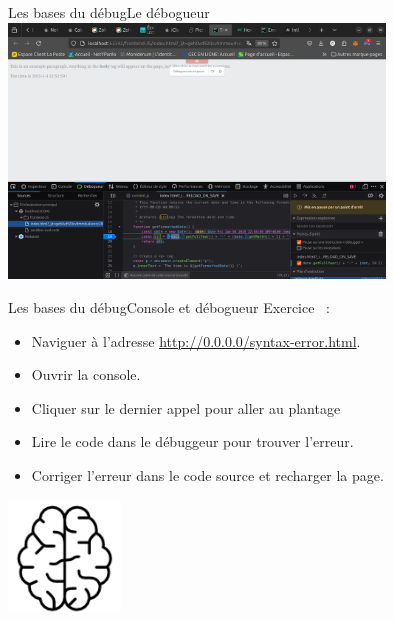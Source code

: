 \documentclass{beamer}
\begin{document}
\begin{frame}{Les bases du débug}{Le débogueur}
    \bigbreak
    \centering
    \includegraphics[width=10cm]{image/js-debugger}
\end{frame}

\begin{frame}{Les bases du débug}{Console et débogueur}
    Exercice \execcounterdispinc{}~:
    \begin{itemize}
        \item Naviguer à l'adresse \url{http://0.0.0.0/syntax-error.html}.
        \item Ouvrir la console.
        \item Cliquer sur le dernier appel pour aller au plantage
        \item Lire le code dans le débuggeur pour trouver l'erreur.
        \item Corriger l'erreur dans le code source et recharger la page.
    \end{itemize}
    \bigbreak
    \centering
    \includegraphics[width=3cm]{image/intelligence}
\end{frame}
\end{document}
